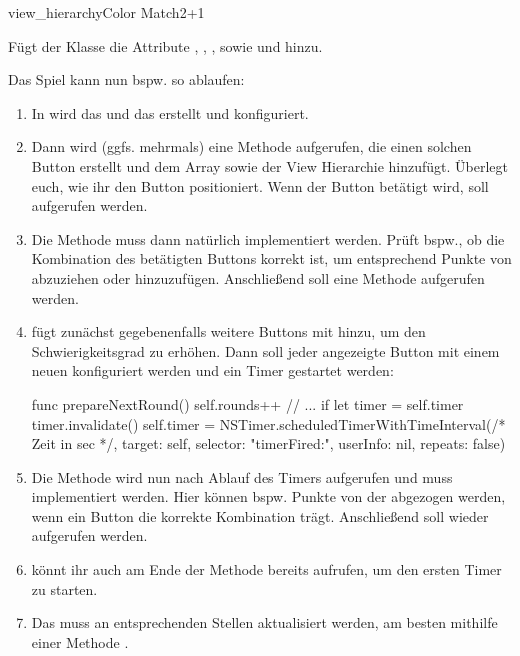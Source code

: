 \documentclass[parskip=half, final]{scrreprt}
\begin{document}
\begin{lecture}
\begin{exc}
\begin{excitem}{view_hierarchy}{Color Match}{2+1}
\begin{description}
	Fügt der  Klasse die Attribute , , , sowie  und  hinzu.
	
	Das Spiel kann nun bspw. so ablaufen:
	
	\begin{enumerate}
		\item In  wird das  und das  erstellt und konfiguriert.
		\item Dann wird (ggfs. mehrmals) eine Methode  aufgerufen, die einen solchen Button erstellt und dem Array  sowie der View Hierarchie hinzufügt. Überlegt euch, wie ihr den Button positioniert. Wenn der Button betätigt wird, soll  aufgerufen werden.
		\item Die Methode  muss dann natürlich implementiert werden. Prüft bspw., ob die Kombination des betätigten Buttons korrekt ist, um entsprechend Punkte von  abzuziehen oder hinzuzufügen. Anschließend soll eine Methode  aufgerufen werden.
		\item {} fügt zunächst gegebenenfalls weitere Buttons mit  hinzu, um den Schwierigkeitsgrad zu erhöhen. Dann soll jeder angezeigte Button mit einem neuen  konfiguriert werden und ein Timer gestartet werden:
		\begin{swiftcode}
    func prepareNextRound() {
        self.rounds++
        // ...
        if let timer = self.timer {
            timer.invalidate()
        }
        self.timer = NSTimer.scheduledTimerWithTimeInterval(/* Zeit in sec */, target: self, selector: "timerFired:", userInfo: nil, repeats: false)
    }
		\end{swiftcode}
		\item Die Methode  wird nun nach Ablauf des Timers aufgerufen und muss implementiert werden. Hier können bspw. Punkte von der  abgezogen werden, wenn ein Button die korrekte Kombination trägt. Anschließend soll wieder  aufgerufen werden.
		\item {} könnt ihr auch am Ende der  Methode bereits aufrufen, um den ersten Timer zu starten.
		\item Das  muss an entsprechenden Stellen aktualisiert werden, am besten mithilfe einer Methode .
	\end{enumerate}
	

\end{description}
\end{excitem}
\end{exc}
\end{lecture}
\end{document}
